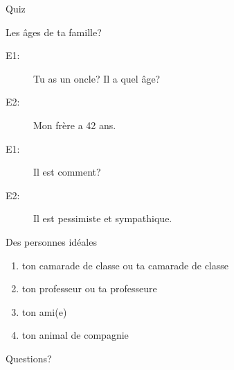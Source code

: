 \documentclass{beamer}
\begin{document}
  \begin{frame}{}
    \begin{center}
      \Large Quiz
    \end{center}
  \end{frame}

  \begin{frame}{Les âges de ta famille?}
    \begin{description}
      \item[E1:] Tu as un oncle? Il a quel âge?
      \item[E2:] Mon frère a 42 ans.
      \item[E1:] Il est comment?
      \item[E2:] Il est pessimiste et sympathique.
    \end{description}
  \end{frame}

  \begin{frame}{Des personnes idéales}
    \begin{enumerate}
      \item ton camarade de classe ou ta camarade de classe
      \item ton professeur ou ta professeure
      \item ton ami(e)
      \item ton animal de compagnie
    \end{enumerate}
  \end{frame}

  \begin{frame}{}
    \begin{center}
      \Large Questions?
    \end{center}
  \end{frame}
\end{document}
